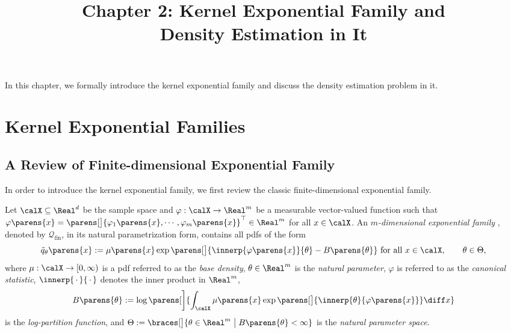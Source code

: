 \documentclass[12pt]{article}
\title{ \setstretch{1.0} \textbf{\Large Chapter 2: Kernel Exponential Family and \\ Density Estimation in It}}
\author{}
\date{}
\theoremstyle{definition}
\theoremstyle{theorem}
\theoremstyle{remark}
\begin{document}
\thispagestyle{plain}
\maketitle

\tableofcontents

\newpage

In this chapter, we formally introduce the kernel exponential family and discuss the density estimation problem in it. 

\section{Kernel Exponential Families}

\subsection{A Review of Finite-dimensional Exponential Family}\label{subsection-fin-dim-exp-fam}

In order to introduce the kernel exponential family, we first review the classic finite-dimensional exponential family. 

Let $\calX \subseteq \Real^d$ be the sample space and $\varphi: \calX \to \Real^m$ be a measurable vector-valued function such that $\varphi \parens{x} = \parens[\big]{\varphi_1 \parens{x}, \cdots, \varphi_m \parens{x}}^\top \in \Real^m$ for all $x \in \calX$. An \textit{$m$-dimensional exponential family} \parencite{Brown1986-ef, Barndorff-Nielsen2014-ua}, denoted by $\mathcal{Q}_{\mathrm{fin}}$, in its natural parametrization form, contains all pdfs of the form 
\begin{align}\label{eq-fin-exp-fam}
	\tilde{q}_{\theta} \parens{x} := \mu \parens{x} \exp \parens[\big]{\innerp{\varphi \parens{x}}{\theta} - B \parens{\theta}} \text{ for all } x \in \calX, \qquad \theta \in \Theta, 
\end{align}
where $\mu: \calX \to [0, \infty)$ is a pdf referred to as the \textit{base density}, $\theta \in \Real^m$ is the \textit{natural parameter}, $\varphi$ is referred to as the \textit{canonical statistic}, $\innerp{\,\cdot\,}{\,\cdot\,}$ denotes the inner product in $\Real^m$, 
\begin{align}\label{eq-log-partition-fun-finexpfam}
	B \parens{\theta} := \log \parens[\bigg]{\int_{\calX} \mu \parens{x} \exp \parens[\big]{\innerp{\theta}{\varphi \parens{x}}} \diff x}
\end{align}
is the \textit{log-partition function}, and $\Theta := \braces[\big]{\theta \in \Real^m \bigm| B \parens{\theta} < \infty}$ is the \textit{natural parameter space}. %
\end{document}

